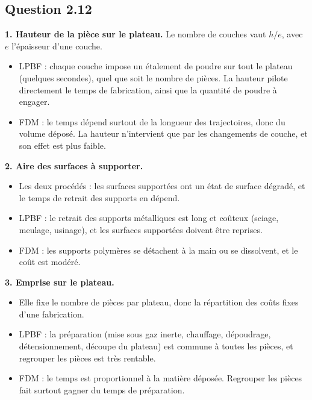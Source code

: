 \documentclass[11pt,a4paper]{article}
\providecommand{\tightlist}{\setlength{\itemsep}{0pt}\setlength{\parskip}{0pt}}
\begin{document}
\hypertarget{question-2.12}{%
\subsection{Question 2.12}\label{question-2.12}}

\textbf{1. Hauteur de la pièce sur le plateau.} Le nombre de couches vaut \(h/e\), avec \(e\) l'épaisseur d'une couche.

\begin{itemize}
\tightlist
\item
  LPBF : chaque couche impose un étalement de poudre sur tout le plateau (quelques secondes), quel que soit le nombre de pièces. La hauteur pilote directement le temps de fabrication, ainsi que la quantité de poudre à engager.
\item
  FDM : le temps dépend surtout de la longueur des trajectoires, donc du volume déposé. La hauteur n'intervient que par les changements de couche, et son effet est plus faible.
\end{itemize}

\textbf{2. Aire des surfaces à supporter.}

\begin{itemize}
\tightlist
\item
  Les deux procédés : les surfaces supportées ont un état de surface dégradé, et le temps de retrait des supports en dépend.
\item
  LPBF : le retrait des supports métalliques est long et coûteux (sciage, meulage, usinage), et les surfaces supportées doivent être reprises.
\item
  FDM : les supports polymères se détachent à la main ou se dissolvent, et le coût est modéré.
\end{itemize}

\textbf{3. Emprise sur le plateau.}

\begin{itemize}
\tightlist
\item
  Elle fixe le nombre de pièces par plateau, donc la répartition des coûts fixes d'une fabrication.
\item
  LPBF : la préparation (mise sous gaz inerte, chauffage, dépoudrage, détensionnement, découpe du plateau) est commune à toutes les pièces, et regrouper les pièces est très rentable.
\item
  FDM : le temps est proportionnel à la matière déposée. Regrouper les pièces fait surtout gagner du temps de préparation.
\end{itemize}
\end{document}
